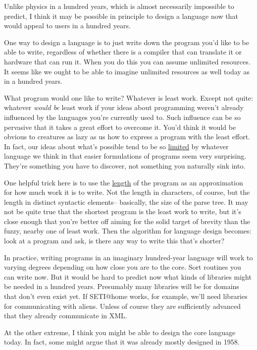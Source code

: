 Unlike physics in a hundred years, which is almost necessarily
impossible to predict, I think it may be possible in principle to design
a language now that would appeal to users in a hundred years.

One way to design a language is to just write down the program you'd
like to be able to write, regardless of whether there is a compiler that
can translate it or hardware that can run it. When you do this you can
assume unlimited resources. It seems like we ought to be able to imagine
unlimited resources as well today as in a hundred years.

What program would one like to write? Whatever is least work. Except not
quite: whatever \emph{would be} least work if your ideas about
programming weren't already influenced by the languages you're currently
used to. Such influence can be so pervasive that it takes a great effort
to overcome it. You'd think it would be obvious to creatures as lazy as
us how to express a program with the least effort. In fact, our ideas
about what's possible tend to be so \href{avg.html}{limited} by whatever
language we think in that easier formulations of programs seem very
surprising. They're something you have to discover, not something you
naturally sink into.

One helpful trick here is to use the \href{power.html}{length} of the
program as an approximation for how much work it is to write. Not the
length in characters, of course, but the length in distinct syntactic
elements-- basically, the size of the parse tree. It may not be quite
true that the shortest program is the least work to write, but it's
close enough that you're better off aiming for the solid target of
brevity than the fuzzy, nearby one of least work. Then the algorithm for
language design becomes: look at a program and ask, is there any way to
write this that's shorter?

In practice, writing programs in an imaginary hundred-year language will
work to varying degrees depending on how close you are to the core. Sort
routines you can write now. But it would be hard to predict now what
kinds of libraries might be needed in a hundred years. Presumably many
libraries will be for domains that don't even exist yet. If SETI@home
works, for example, we'll need libraries for communicating with aliens.
Unless of course they are sufficiently advanced that they already
communicate in XML.

At the other extreme, I think you might be able to design the core
language today. In fact, some might argue that it was already mostly
designed in 1958.

